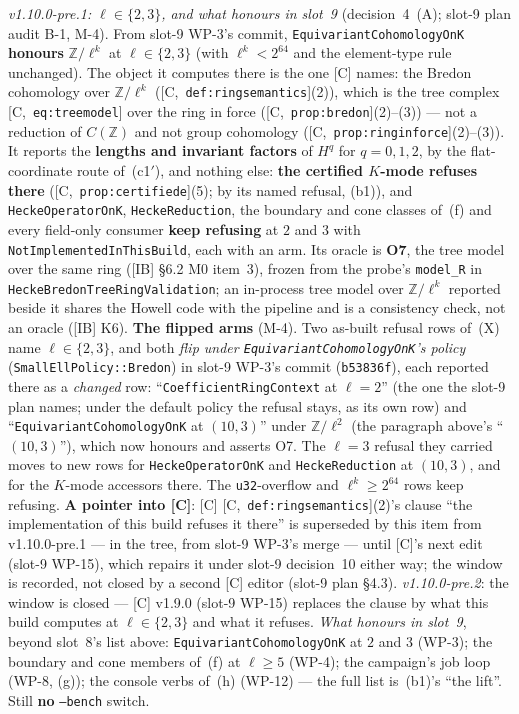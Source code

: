 \documentclass[11pt]{article}
\theoremstyle{remark}
\newcommand{\Z}{\mathbb{Z}}
\newcommand{\HA}[1]{[C,~\texttt{#1}]}      %
\begin{document}
\begin{enumerate}[label=(b\arabic*)]
  \begingroup\sloppy\emph{v1.10.0-pre.1: $\ell\in\{2,3\}$, and what honours in slot~9} (decision~4~(A); slot-9 plan
  audit B-1, M-4). From slot-9 WP-3's commit, \texttt{EquivariantCohomologyOnK} \textbf{honours}
  $\Z/\ell^k$ at $\ell\in\{2,3\}$ (with $\ell^k<2^{64}$ and the element-type rule unchanged). The
  object it computes there is the one [C] names: the Bredon cohomology over $\Z/\ell^k$
  (\HA{def:ringsemantics}(2)), which is the tree complex \HA{eq:treemodel} over the ring in
  force (\HA{prop:bredon}(2)--(3)) --- not a reduction of $C(\Z)$ and not group cohomology
  (\HA{prop:ringinforce}(2)--(3)). It reports the \textbf{lengths and invariant factors} of
  $H^q$ for $q=0,1,2$, by the flat-coordinate route of~(c1$'$), and nothing else: \textbf{the
  certified $K$-mode refuses there} (\HA{prop:certifiede}(5); by its named refusal,
  (b1)), and \texttt{HeckeOperatorOnK}, \texttt{HeckeReduction}, the boundary and cone classes of~(f)
  and every field-only consumer \textbf{keep refusing} at $2$ and $3$ with
  \texttt{NotImplementedInThisBuild}, each with an arm. Its oracle is \textbf{O7}, the tree model
  over the same ring ([IB] \S6.2 M0 item~3), frozen from the probe's \texttt{model\_R} in
  \texttt{HeckeBredonTreeRingValidation}; an in-process tree model over $\Z/\ell^k$ reported beside
  it shares the Howell code with the pipeline and is a consistency check, not an oracle ([IB] K6).
  \textbf{The flipped arms} (M-4). Two as-built refusal rows of~(X) name $\ell\in\{2,3\}$, and
  both \emph{flip under \texttt{EquivariantCohomologyOnK}'s policy} (\texttt{SmallEllPolicy::Bredon})
  in slot-9 WP-3's commit (\texttt{b53836f}), each reported there as a \emph{changed} row:
  ``\texttt{CoefficientRingContext} at $\ell=2$'' (the one the slot-9 plan names; under the default
  policy the refusal stays, as its own row) and ``\texttt{EquivariantCohomologyOnK} at $(10,3)$''
  under $\Z/\ell^2$ (the paragraph above's ``$(10,3)$''), which now honours and asserts O7. The $\ell=3$ refusal they carried moves to new rows for
  \texttt{HeckeOperatorOnK} and \texttt{HeckeReduction} at $(10,3)$, and for the $K$-mode
  accessors there. The \texttt{u32}-overflow and $\ell^k\ge2^{64}$ rows keep refusing. \textbf{A pointer into [C]}: [C]
  \HA{def:ringsemantics}(2)'s clause ``the implementation of this build refuses it there'' is
  superseded by this item from v1.10.0-pre.1 --- in the tree, from slot-9 WP-3's merge --- until
  [C]'s next edit (slot-9 WP-15), which repairs it under slot-9 decision~10 either way; the window
  is recorded, not closed by a second [C] editor (slot-9 plan \S4.3). \emph{v1.10.0-pre.2}: the
  window is closed --- [C] v1.9.0 (slot-9 WP-15) replaces the clause by what this build computes
  at $\ell\in\{2,3\}$ and what it refuses. \emph{What honours in slot~9},
  beyond slot~8's list above: \texttt{EquivariantCohomologyOnK} at $2$ and $3$ (WP-3); the boundary
  and cone members of~(f) at $\ell\ge5$ (WP-4); the campaign's job loop (WP-8, (g)); the console
  verbs of~(h) (WP-12) --- the full list is~(b1)'s ``the lift''. Still \textbf{no} \texttt{--bench}
  switch.\par\endgroup


\end{enumerate}
\end{document}

